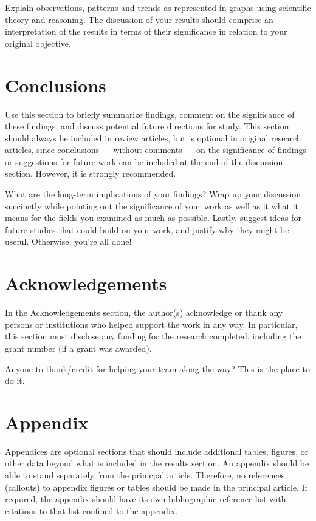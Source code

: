 \documentclass[10pt,twocolumn,letterpaper]{article}
\begin{document}
Explain observations, patterns and trends as represented in graphs using scientific theory and reasoning. The discussion of your results should comprise an interpretation of the results in terms of their significance in relation to your original objective.

\section{Conclusions}
Use this section to briefly summarize findings, comment on the significance of these findings, and discuss potential future directions for study. This section should always be included in review articles, but is optional in original research articles, since conclusions — without comments — on the significance of findings or suggestions for future work can be included at the end of the discussion section. However, it is strongly recommended.

What are the long-term implications of your findings? Wrap up your discussion succinctly while pointing out the significance of your work as well as it what it means for the fields you examined as much as possible. Lastly, suggest ideas for future studies that could build on your work, and justify why they might be useful. Otherwise, you're all done!

\section{Acknowledgements}
In the Acknowledgements section, the author(s) acknowledge or thank any persons or institutions who helped support the work in any way. In particular, this section must disclose any funding for the research completed, including the grant number (if a grant was awarded).

Anyone to thank/credit for helping your team along the way? This is the place to do it.

\section{Appendix}
Appendices are optional sections that should include additional tables, figures, or other data beyond what is included in the results section. An appendix should be able to stand separately from the prinicpal article. Therefore, no references (callouts) to appendix figures or tables should be made in the principal article. If required, the appendix should have its own bibliographic reference list with citations to that list confined to the appendix. \cite{latexcompanion}
\end{document}
